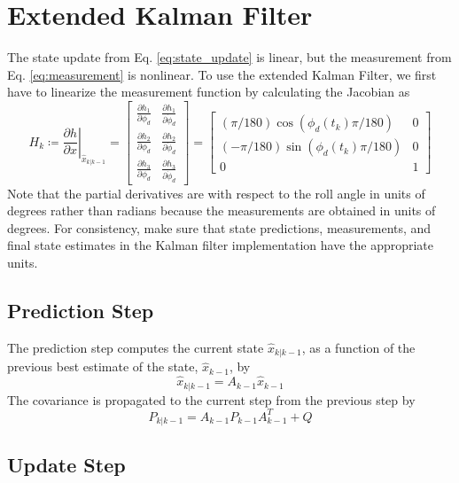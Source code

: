 \documentclass{article}
\begin{document}
	\section{Extended Kalman Filter}
	
	The state update from Eq. \ref{eq:state_update} is linear, but the measurement from Eq. \ref{eq:measurement} is nonlinear. To use the extended Kalman Filter, we first have to linearize the measurement function by calculating the Jacobian as
	\begin{equation}
		H_k\coloneqq \left.\frac{\partial{h}}{\partial{x}}\right|_{\hat{x}_{k|k-1}} = 
		\begin{bmatrix}
		\frac{\partial{h_1}}{\partial{\phi_d}} & \frac{\partial{h_1}}{\partial{\dot{\phi}_d}}\\
		\frac{\partial{h_2}}{\partial{\phi_d}} & \frac{\partial{h_2}}{\partial{\dot{\phi}_d}}\\
		\frac{\partial{h_3}}{\partial{\phi_d}} & \frac{\partial{h_3}}{\partial{\dot{\phi}_d}}
		\end{bmatrix}
		=
		\begin{bmatrix}
		(\pi/180)\cos(\phi_d(t_k)\pi/180) & 0\\
		(-\pi/180)\sin(\phi_d(t_k)\pi/180) & 0\\
		0 & 1
		\end{bmatrix}
	\end{equation}
	Note that the partial derivatives are with respect to the roll angle in units of degrees rather than radians because the measurements are obtained in units of degrees. For consistency, make sure that state predictions, measurements, and final state estimates in the Kalman filter implementation have the appropriate units.
	
	\subsection{Prediction Step}
	
	The prediction step computes the current state $\hat{x}_{k|k-1}$, as a function of the previous best estimate of the state, $\hat{x}_{k-1}$, by
	\begin{equation}
		\hat{x}_{k|k-1} = A_{k-1}\hat{x}_{k-1}
	\end{equation}
	The covariance is propagated to the current step from the previous step by
	\begin{equation}
		P_{k|k-1} = A_{k-1}P_{k-1}A^T_{k-1} + Q
	\end{equation}
	
	\subsection{Update Step}
	
\end{document}
